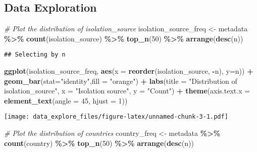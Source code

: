 \documentclass[
]{article}
\newenvironment{Shaded}{\begin{snugshade}}{\end{snugshade}}
\newcommand{\AttributeTok}[1]{\textcolor[rgb]{0.13,0.29,0.53}{#1}}
\newcommand{\CommentTok}[1]{\textcolor[rgb]{0.56,0.35,0.01}{\textit{#1}}}
\newcommand{\DecValTok}[1]{\textcolor[rgb]{0.00,0.00,0.81}{#1}}
\newcommand{\FunctionTok}[1]{\textcolor[rgb]{0.13,0.29,0.53}{\textbf{#1}}}
\newcommand{\NormalTok}[1]{#1}
\newcommand{\OtherTok}[1]{\textcolor[rgb]{0.56,0.35,0.01}{#1}}
\newcommand{\SpecialCharTok}[1]{\textcolor[rgb]{0.81,0.36,0.00}{\textbf{#1}}}
\newcommand{\StringTok}[1]{\textcolor[rgb]{0.31,0.60,0.02}{#1}}
\begin{document}
\hypertarget{data-exploration}{%
\subsection{Data Exploration}\label{data-exploration}}

\begin{Shaded}
\begin{Highlighting}[]
\CommentTok{\# Plot the distribution of isolation\_source}
\NormalTok{isolation\_source\_freq }\OtherTok{\textless{}{-}}\NormalTok{ metadata }\SpecialCharTok{\%\textgreater{}\%}
  \FunctionTok{count}\NormalTok{(isolation\_source) }\SpecialCharTok{\%\textgreater{}\%}
  \FunctionTok{top\_n}\NormalTok{(}\DecValTok{50}\NormalTok{) }\SpecialCharTok{\%\textgreater{}\%}
  \FunctionTok{arrange}\NormalTok{(}\FunctionTok{desc}\NormalTok{(n))}
\end{Highlighting}
\end{Shaded}

\begin{verbatim}
## Selecting by n
\end{verbatim}

\begin{Shaded}
\begin{Highlighting}[]
\FunctionTok{ggplot}\NormalTok{(isolation\_source\_freq, }\FunctionTok{aes}\NormalTok{(}\AttributeTok{x =} \FunctionTok{reorder}\NormalTok{(isolation\_source, }\SpecialCharTok{{-}}\NormalTok{n), }\AttributeTok{y=}\NormalTok{n)) }\SpecialCharTok{+}
  \FunctionTok{geom\_bar}\NormalTok{(}\AttributeTok{stat=}\StringTok{"identity"}\NormalTok{,}\AttributeTok{fill =} \StringTok{"orange"}\NormalTok{) }\SpecialCharTok{+}
  \FunctionTok{labs}\NormalTok{(}\AttributeTok{title =} \StringTok{"Distribution of isolation\_source"}\NormalTok{, }\AttributeTok{x =} \StringTok{"Isolation source"}\NormalTok{, }\AttributeTok{y =} \StringTok{"Count"}\NormalTok{) }\SpecialCharTok{+}
  \FunctionTok{theme}\NormalTok{(}\AttributeTok{axis.text.x =} \FunctionTok{element\_text}\NormalTok{(}\AttributeTok{angle =} \DecValTok{45}\NormalTok{, }\AttributeTok{hjust =} \DecValTok{1}\NormalTok{))}
\end{Highlighting}
\end{Shaded}

\texttt{[image: data\_explore\_files/figure-latex/unnamed-chunk-3-1.pdf]}

\begin{Shaded}
\begin{Highlighting}[]
\CommentTok{\# Plot the distribution of countries}
\NormalTok{country\_freq }\OtherTok{\textless{}{-}}\NormalTok{ metadata }\SpecialCharTok{\%\textgreater{}\%}
  \FunctionTok{count}\NormalTok{(country) }\SpecialCharTok{\%\textgreater{}\%}
  \FunctionTok{top\_n}\NormalTok{(}\DecValTok{50}\NormalTok{) }\SpecialCharTok{\%\textgreater{}\%}
  \FunctionTok{arrange}\NormalTok{(}\FunctionTok{desc}\NormalTok{(n))}
\end{Highlighting}
\end{Shaded}
\end{document}
